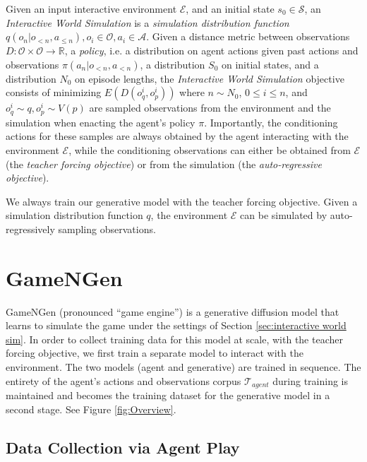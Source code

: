 \documentclass{article} %
\begin{document}
Given an input interactive environment $\mathcal{E}$, and an initial state $s_0 \in \mathcal{S}$, an \emph{Interactive World Simulation} is a \emph{simulation distribution function} $q(o_n| o_{<n}, a_{\le n}), o_i \in \mathcal{O}, a_i \in \mathcal{A}$.
Given a distance metric between observations $D:\mathcal{O}\times\mathcal{O} \to \mathbb{R}$, a \emph{policy}, i.e. a distribution on agent actions given past actions and observations $\pi(a_n|o_{<n}, a_{<n})$, a distribution $S_0$ on initial states, and a distribution $N_0$ on episode lengths, the \emph{Interactive World Simulation} objective consists of minimizing $E(D(o_q^i, o_p^i))$ where $n \sim N_0$, $0 \le i \le n$, and $o_q^i \sim q, o_p^i \sim V(p)$ are sampled observations from the environment and the simulation when enacting the agent's policy $\pi$. Importantly, the conditioning actions for these samples are always obtained by the agent interacting with the environment $\mathcal{E}$, while the conditioning observations can either be obtained from $\mathcal{E}$ (the \emph{teacher forcing objective}) or from the simulation (the \emph{auto-regressive objective}).

We always train our generative model with the teacher forcing objective. Given a simulation distribution function $q$, the environment $\mathcal{E}$ can be simulated by auto-regressively sampling observations.


\section{GameNGen}
\label{sec:method}

GameNGen (pronounced ``game engine'') is a generative diffusion model that learns to simulate the game under the settings of Section \ref{sec:interactive world sim}. In order to collect training data for this model at scale, with the teacher forcing objective, we first train a separate model to interact with the environment. The two models (agent and generative) are trained in sequence. The entirety of the agent's actions and observations corpus $\mathcal{T}_{agent}$ during training is maintained and becomes the training dataset for the generative model in a second stage. See Figure \ref{fig:Overview}.



\subsection{Data Collection via Agent Play}
\label{agent-play}
\end{document}
